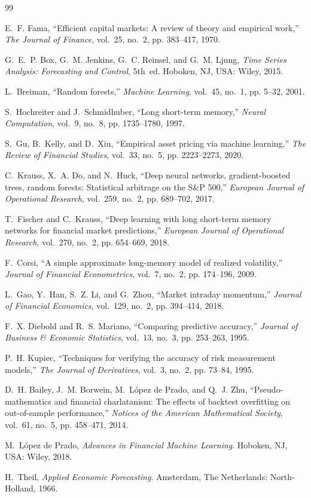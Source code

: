 \documentclass[conference]{IEEEtran}
\begin{document}
\begin{thebibliography}{99}

E.~F. Fama, ``Efficient capital markets: A review of theory and empirical work,'' \emph{The Journal of Finance}, vol.~25, no.~2, pp. 383--417, 1970.

G.~E.~P. Box, G.~M. Jenkins, G.~C. Reinsel, and G.~M. Ljung, \emph{Time Series Analysis: Forecasting and Control}, 5th~ed. Hoboken, NJ, USA: Wiley, 2015.

L.~Breiman, ``Random forests,'' \emph{Machine Learning}, vol.~45, no.~1, pp. 5--32, 2001.

S.~Hochreiter and J.~Schmidhuber, ``Long short-term memory,'' \emph{Neural Computation}, vol.~9, no.~8, pp. 1735--1780, 1997.

S.~Gu, B.~Kelly, and D.~Xiu, ``Empirical asset pricing via machine learning,'' \emph{The Review of Financial Studies}, vol.~33, no.~5, pp. 2223--2273, 2020.

C.~Krauss, X.~A. Do, and N.~Huck, ``Deep neural networks, gradient-boosted trees, random forests: Statistical arbitrage on the S\&P 500,'' \emph{European Journal of Operational Research}, vol.~259, no.~2, pp. 689--702, 2017.

T.~Fischer and C.~Krauss, ``Deep learning with long short-term memory networks for financial market predictions,'' \emph{European Journal of Operational Research}, vol.~270, no.~2, pp. 654--669, 2018.

F.~Corsi, ``A simple approximate long-memory model of realized volatility,'' \emph{Journal of Financial Econometrics}, vol.~7, no.~2, pp. 174--196, 2009.

L.~Gao, Y.~Han, S.~Z. Li, and G.~Zhou, ``Market intraday momentum,'' \emph{Journal of Financial Economics}, vol.~129, no.~2, pp. 394--414, 2018.

F.~X. Diebold and R.~S. Mariano, ``Comparing predictive accuracy,'' \emph{Journal of Business \& Economic Statistics}, vol.~13, no.~3, pp. 253--263, 1995.

P.~H. Kupiec, ``Techniques for verifying the accuracy of risk measurement models,'' \emph{The Journal of Derivatives}, vol.~3, no.~2, pp. 73--84, 1995.

D.~H. Bailey, J.~M. Borwein, M.~López de Prado, and Q.~J. Zhu, ``Pseudo-mathematics and financial charlatanism: The effects of backtest overfitting on out-of-sample performance,'' \emph{Notices of the American Mathematical Society}, vol.~61, no.~5, pp. 458--471, 2014.

M.~López de Prado, \emph{Advances in Financial Machine Learning}. Hoboken, NJ, USA: Wiley, 2018.

H.~Theil, \emph{Applied Economic Forecasting}. Amsterdam, The Netherlands: North-Holland, 1966.

\end{thebibliography}
\end{document}
